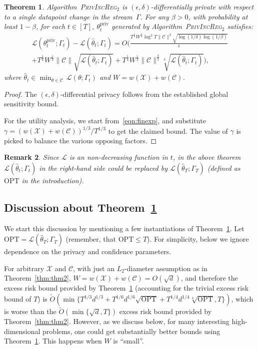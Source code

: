 \documentclass{article}
\theoremstyle{plain}
\newtheorem{theorem}{Theorem}[section]
\newtheorem{remark}[theorem]{Remark}
\def \ProjPrivIncReg {\textsc{PrivIncReg$_2$}\xspace}
\def \eps {\epsilon}
\def \CCC {\mathcal{C}}
\def \XXX {\mathcal{X}}
\def \LLL {\mathcal{L}}
\def \priv {{\mathrm{priv}}}
\def \OPT {{\mathrm{OPT}}}
\begin{document}
\begin{theorem} \label{thm:thm6}
Algorithm~\ProjPrivIncReg is $(\eps,\delta)$-differentially private with respect to a single datapoint change in the stream~$\Gamma$. For any $\beta > 0$, with probability at least $1-\beta$, for each $t \in [T]$, $\theta^\priv_t$ generated by Algorithm~\ProjPrivIncReg satisfies: 
\begin{multline*}
\LLL(\theta^\priv_t;\Gamma_t) -  \LLL(\hat{\theta}_t;\Gamma_t) = O (\frac{T^{\frac 1 3} W^{\frac 2 3} \log^{2} T \| \CCC \|^2  \sqrt{\log(1/\delta)\log(1/\beta)}}{\eps} \\
+ T^{\frac 1 6}W^{\frac 1 3} \| \CCC \|\sqrt{\LLL(\hat{\theta}_t;\Gamma_t)} + T^{\frac 1 4}W^{\frac 1 2} \| \CCC \|^{\frac 3 2} \sqrt[4]{\LLL(\hat{\theta}_t;\Gamma_t)}),
\end{multline*}
where $\hat{\theta}_t \in \min_{\theta \in \CCC}\, \LLL(\theta;\Gamma_t)$ and $W=w(\XXX)+w(\CCC)$.
\end{theorem}
\begin{proof}
The $(\eps,\delta)$-differential privacy follows from the established global sensitivity bound.

For the utility analysis, we start from~\eqref{eqn:finexp}, and substitute $\gamma = (w(\XXX)+w(\CCC))^{1/3}/T^{1/3}$ to get the claimed bound. The value of $\gamma$ is picked to balance the various opposing factors.
\end{proof}


\begin{remark}
Since $\LLL$ is an non-decreasing function in $t$, in the above theorem $\LLL(\hat{\theta}_t;\Gamma_t)$ in the right-hand side could be replaced by $\LLL(\hat{\theta}_T;\Gamma_T)$ (defined as $\OPT$ in the introduction).
\end{remark}

\subsection{Discussion about Theorem~\ref{thm:thm6}} \label{sec:inst}
We start this discussion by mentioning a few instantiations of Theorem~\ref{thm:thm6}. Let $\OPT = \LLL(\hat{\theta}_T;\Gamma_T)$ (remember, that $\OPT \leq T$). For simplicity, below we ignore dependence on the privacy and confidence parameters.

For arbitrary $\XXX$ and $\CCC$, with just an $L_2$-diameter assumption as in Theorem~\ref{thm:thm2}, $W=w(\XXX)+w(\CCC)=O(\sqrt{d})$, and therefore the excess risk bound provided by Theorem~\ref{thm:thm6} (accounting for the trivial excess risk bound of $T$) is $\tilde{O}(\min\{T^{1/3} d^{1/3} + T^{1/6} d^{1/6} \sqrt{\OPT} + T^{1/4} d^{1/4} \sqrt[4]{\OPT},T\})$, which is worse than the $\tilde{O}(\min\{\sqrt{d},T\})$ excess risk bound provided by Theorem~\ref{thm:thm2}. However, as we discuss below, for many interesting high-dimensional problems, one could get substantially better bounds using Theorem~\ref{thm:thm6}. This happens when $W$ is ``small''.
\end{document}
